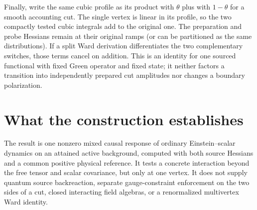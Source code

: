 \documentclass[11pt]{article}
\numberwithin{equation}{section}
\begin{document}
Finally, write the same cubic profile as its
product with \(\theta\) plus with \(1-\theta\)
for a smooth accounting cut. The single vertex
is linear in its profile, so the two compactly
tested cubic integrals add to the original one.
The preparation and probe Hessians remain at
their original ramps (or can be partitioned as
the same distributions). If a split Ward
derivation differentiates the two complementary
switches, those terms cancel on addition.
This is an identity for one sourced functional
with fixed Green operator and fixed state;
it neither factors a transition into independently
prepared cut amplitudes nor changes a boundary
polarization.

\section{What the construction establishes}

The result is one nonzero mixed causal response of
ordinary Einstein--scalar dynamics on an attained
active background, computed with both source Hessians
and a common positive physical reference.
It tests a concrete interaction beyond the free
tensor and scalar covariance, but only at one vertex.
It does not supply quantum source backreaction,
separate gauge-constraint enforcement on the two
sides of a cut, closed interacting field algebras,
or a renormalized multivertex Ward identity.
\end{document}
